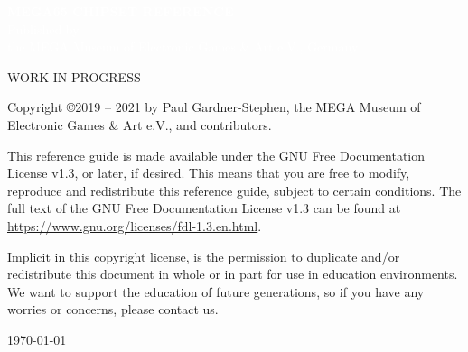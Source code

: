 





\cleardoublepage


  \begin{titlepage}
    \pagecolor{blue}
     \begin{center}
       {
         \large
         \vspace*{2cm}
               {\Huge\textcolor{white}{\bf{MEGA65 CHIPSET REFERENCE}}}\\
             \vspace{\fill}
                    {\textcolor{white}
                    {Published by \\ the MEGA Museum of Electronic Games \& Art e.V., Germany.}}
       }
     \end{center}
   \end{titlepage}

  \pagecolor{white}\textcolor{black}
  \vfill
  WORK IN PROGRESS

  Copyright \copyright 2019 -- 2021 by Paul Gardner-Stephen,
  the MEGA Museum of Electronic Games \& Art e.V.,
  and contributors.

  This reference guide is made available under the GNU Free Documentation
  License v1.3, or later, if desired. This means that you are free to
  modify, reproduce and redistribute this reference guide, subject to
  certain conditions. The full text of the GNU Free Documentation
  License v1.3 can be found at
  \url{https://www.gnu.org/licenses/fdl-1.3.en.html}.

  Implicit in this copyright license, is the permission to duplicate
  and/or redistribute this document in whole or in part for use in
  education environments. We want to support the education of future
  generations, so if you have any worries or concerns, please contact us.

   \par\today

